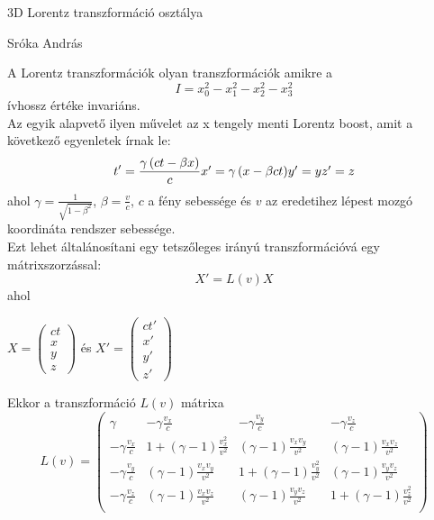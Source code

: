 \documentclass[12pt,a4paper]{article}
\renewcommand{\baselinestretch}{2}
\begin{document}
\begin{center}
\begin{Huge}
3D Lorentz transzformáció osztálya\\
\end{Huge}
\begin{large}
Sróka András\\
\end{large}
\end{center}
A Lorentz transzformációk olyan transzformációk amikre a
\begin{equation}
I = x_0^2-x_1^2-x_2^2-x_3^2
\end{equation}
ívhossz értéke invariáns.\\
Az egyik alapvető ilyen művelet az x tengely menti Lorentz boost, amit a következő egyenletek írnak le:
\renewcommand{\baselinestretch}{0.5}
\begin{equation}
t' = \frac{\gamma \left( ct-\beta x \right)}{c}$$$$
x' = \gamma \left( x-\beta ct \right)$$$$
y'=y$$$$
z'=z
\end{equation}
\renewcommand{\baselinestretch}{2} 
ahol $\gamma = \frac{1}{\sqrt{1-\beta^2}}$, $\beta  = \frac{v}{c}$, $c$ a fény sebessége és $v$ az eredetihez lépest mozgó koordináta rendszer sebessége.\\
Ezt lehet általánosítani egy tetszőleges irányú transzformációvá egy mátrixszorzással:
$$X'=L(v)X$$
ahol\begin{center}
$X = \begin{pmatrix}
ct\\x\\y\\z
\end{pmatrix}
$   és   $
X' = \begin{pmatrix}
ct'\\x'\\y'\\z'
\end{pmatrix}$
\end{center}
Ekkor a transzformáció $L(v)$ mátrixa
\begin{equation}
L(v) = \begin{pmatrix}
\gamma & -\gamma\frac{v_x}{c} & -\gamma\frac{v_y}{c} & -\gamma\frac{v_z}{c}\\
-\gamma\frac{v_x}{c} & 1+(\gamma-1)\frac{v_x^2}{v^2} & (\gamma-1)\frac{v_xv_y}{v^2} & (\gamma-1)\frac{v_xv_z}{v^2}\\
-\gamma\frac{v_y}{c} & (\gamma-1)\frac{v_xv_y}{v^2} & 1+(\gamma-1)\frac{v_y^2}{v^2} & (\gamma-1)\frac{v_yv_z}{v^2}\\
-\gamma\frac{v_z}{c} & (\gamma-1)\frac{v_xv_z}{v^2} & (\gamma-1)\frac{v_yv_z}{v^2} & 1+(\gamma-1)\frac{v_z^2}{v^2}\\
\end{pmatrix}
\end{equation}
\end{document}
